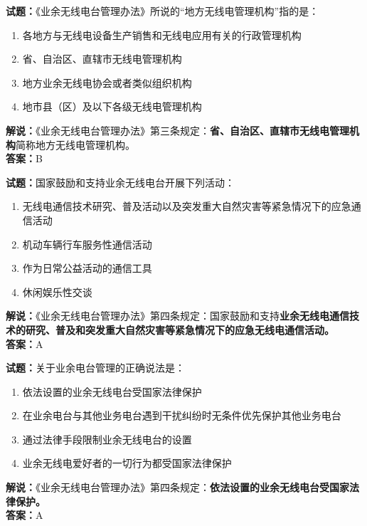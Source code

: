 \documentclass{ctexbook}
\begin{document}
\bigskip


\noindent\textbf{试题：}《业余无线电台管理办法》所说的“地方无线电管理机构”指的是：

\begin{enumerate}[leftmargin=3em]
	\item 各地方与无线电设备生产销售和无线电应用有关的行政管理机构
	\item 省、自治区、直辖市无线电管理机构
	\item 地方业余无线电协会或者类似组织机构
	\item 地市县（区）及以下各级无线电管理机构
\end{enumerate}

\noindent\textbf{解说：}《业余无线电台管理办法》第三条规定：\textbf{省、自治区、直辖市无线电管理机构}简称地方无线电管理机构。\\\noindent\textbf{答案：}B

\bigskip


\noindent\textbf{试题：}国家鼓励和支持业余无线电台开展下列活动：

\begin{enumerate}[leftmargin=3em]
	\item 无线电通信技术研究、普及活动以及突发重大自然灾害等紧急情况下的应急通信活动
	\item 机动车辆行车服务性通信活动
	\item 作为日常公益活动的通信工具
	\item 休闲娱乐性交谈
\end{enumerate}

\noindent\textbf{解说：}《业余无线电台管理办法》第四条规定：国家鼓励和支持\textbf{业余无线电通信技术的研究、普及和突发重大自然灾害等紧急情况下的应急无线电通信活动。}\\\noindent\textbf{答案：}A

\bigskip


\noindent\textbf{试题：}关于业余电台管理的正确说法是：

\begin{enumerate}[leftmargin=3em]
	\item 依法设置的业余无线电台受国家法律保护
	\item 在业余电台与其他业务电台遇到干扰纠纷时无条件优先保护其他业务电台
	\item 通过法律手段限制业余无线电台的设置
	\item 业余无线电爱好者的一切行为都受国家法律保护
\end{enumerate}

\noindent\textbf{解说：}《业余无线电台管理办法》第四条规定：\textbf{依法设置的业余无线电台受国家法律保护。}\\\noindent\textbf{答案：}A
\end{document}
